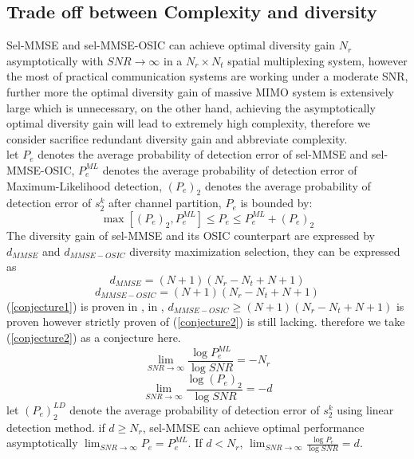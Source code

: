 \documentclass[12pt,a4paper,final]{article}
\begin{document}
\begin{spacing}{2.5}
\section{Trade off between Complexity and diversity}
Sel-MMSE and sel-MMSE-OSIC can achieve optimal diversity gain $N_{r}$ asymptotically \cite{6} \cite{9} with $SNR\to \infty$ in a $N_{r}\times N_{t}$ spatial multiplexing system\cite{2}, however the most of practical communication systems are working under a moderate SNR, further more the optimal diversity gain of massive MIMO system is extensively large which is unnecessary, on the other hand, achieving the asymptotically optimal diversity gain will lead to extremely high complexity, therefore we consider sacrifice redundant diversity gain and abbreviate complexity.\\
let $P_{e}$ denotes the average probability of detection error of sel-MMSE and sel-MMSE-OSIC, $P_{e}^{ML}$ denotes the average probability of detection error of Maximum-Likelihood detection, $(P_{e})_{2}$ denotes the average probability of detection error of $s_{2}^{k}$ after channel partition, $P_{e}$ is bounded by\cite{2}:
\begin{equation}
\max[(P_{e})_{2},P_{e}^{ML}]\leq P_{e} \leq P_{e}^{ML}+(P_{e})_{2}\label{equation16}
\end{equation}
The diversity gain of sel-MMSE and its OSIC counterpart are expressed by $d_{MMSE}$ and $d_{MMSE-OSIC}$ diversity maximization selection, they can be expressed as\cite{2}
\begin{equation}
d_{MMSE}=(N+1)(N_{r}-N_{t}+N+1)  \label{conjecture1}
\end{equation}
\begin{equation}
d_{MMSE-OSIC}=(N+1)(N_{r}-N_{t}+N+1)\label{conjecture2}
\end{equation}
(\ref{conjecture1}) is proven in \cite{9}, in \cite{2}, $d_{MMSE-OSIC}\geq (N+1)(N_{r}-N_{t}+N+1)$ is proven however strictly proven of (\ref{conjecture2}) is still lacking. therefore we take (\ref{conjecture2}) as a conjecture here.
\begin{equation}
\lim_{SNR\rightarrow \infty}\frac{\log{P_{e}^{ML}}}{\log{SNR}}=-N_{r}
\end{equation}   
\begin{equation}
\lim_{SNR\rightarrow \infty}\frac{\log{(P_{e})_{2}}}{\log{SNR}}=-d
\end{equation}
let $(P_{e})_{2}^{LD}$ denote the average probability of detection error of $s_{2}^{k}$ using linear detection method.
if $d\geq N_{r}$, sel-MMSE can achieve optimal performance asymptotically $\lim_{SNR\rightarrow \infty}P_{e}=P_{e}^{ML}$. If $d<N_{r}$, $\lim_{SNR\rightarrow \infty}\frac{\log{P_{e}}}{\log{SNR}}=d$\cite{2}.

\end{spacing}
\end{document}
